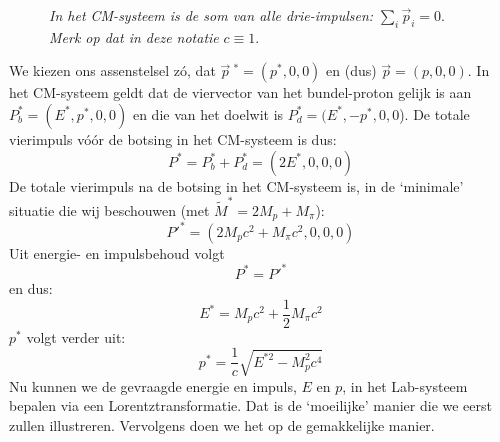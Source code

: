 
\begin{figure}[ht]
\centering
\caption{{\sl In het CM-systeem is de som van alle drie-impulsen:} $\sum_i\vec{p}_i = 0$. {\sl Merk op dat in deze notatie } $c\equiv 1$.}
\label{f:epcmsbotsing}
\end{figure}


We kiezen ons assenstelsel z\'{o}, dat $\vec{p}\ ^{*} = (p^{*}, 0, 0)$ en
(dus) $\vec{p} = (p, 0, 0)$.
In het CM-systeem geldt dat de viervector van het bundel-proton gelijk is aan
$P_{b}^{*} = (E^*, p^{*}, 0, 0)$ en die van het doelwit is
$P_{d}^{*} = (E^*, -p^{*}, 0, 0$).
De totale vierimpuls v\'{o}\'{o}r de botsing in het CM-systeem is dus:
\begin{displaymath}
P^{*} = P_{b}^{*} + P_{d}^{*} = (2E^*, 0, 0, 0)
\end{displaymath}
De totale vierimpuls na de botsing in het CM-systeem is, in de `minimale'
situatie die wij beschouwen (met $\widetilde{M}^* = 2M_{p} + M_{\pi}$):
\begin{displaymath}
P'^{*} = (2M_{p}c^{2} + M_{\pi}c^{2},0, 0, 0)
\end{displaymath}
Uit energie- en impulsbehoud volgt
\begin{displaymath}
P^{*} = P'^{*}
\end{displaymath}
en dus:
\begin{displaymath}
E^{*} = M_{p}c^{2} + \frac{1}{2}M_{\pi}c^{2}
\end{displaymath}
$p^{*}$ volgt verder uit: 
\begin{displaymath}
p^{*} = \frac{1}{c}\sqrt{E^{*2}  - M_{p}^{2}c^{4}}
\end{displaymath}
Nu kunnen we de gevraagde energie en impuls, $E$ en $p$, in het Lab-systeem
bepalen via een
Lorentztransformatie.
Dat is de `moeilijke' manier die we eerst zullen illustreren.
Vervolgens doen we het op de gemakkelijke manier.

